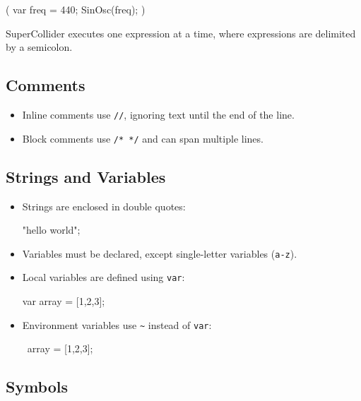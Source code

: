 \begin{supercollider*}
(
var freq = 440;
SinOsc(freq);
)
\end{supercollider*}

SuperCollider executes one expression at a time, where expressions are delimited by a semicolon.

\subsection{Comments}

\begin{itemize}
    \item Inline comments use \texttt{//}, ignoring text until the end of the line.
    \item Block comments use \texttt{/* */} and can span multiple lines.
\end{itemize}

\subsection{Strings and Variables}

\begin{itemize}
    \item Strings are enclosed in double quotes:
    
    \begin{supercollider*}
    "hello world";
    \end{supercollider*}
    
    \item Variables must be declared, except single-letter variables (\texttt{a-z}).
    \item Local variables are defined using \texttt{var}:
    
    \begin{supercollider*}
    var array = [1,2,3];
    \end{supercollider*}
    
    \item Environment variables use \texttt{\~} instead of \texttt{var}:
    
    \begin{supercollider*}
    ~array = [1,2,3];
    \end{supercollider*}
\end{itemize}

\subsection{Symbols}

